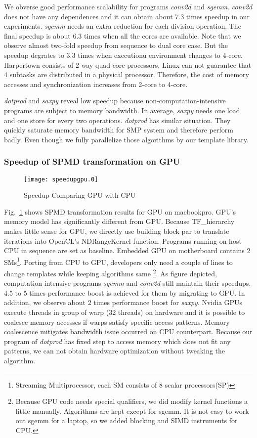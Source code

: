 We obverse good performance scalability for programs
\textit{conv2d} and \textit{sgemm}. \textit{conv2d} does not have any dependences
and it can obtain about 7.3 times speedup in our experiments. \textit{sgemm}
needs an extra reduction for each division operation. The final
speedup is about 6.3 times when all the cores are available. Note that we
observe almost two-fold speedup from sequence to dual core case. But the speedup degrates to 3.3 times when executionu
environment changes to 4-core. Harpertown consists of 2-way quad-core processors,  Linux
can not guarantee that 4 subtasks are distributed in a physical
processor. Therefore, the cost of memory accesses and synchronization
increases from 2-core to 4-core.

\textit{dotprod} and \textit{saxpy} reveal low speedup because non-computation-intensive
programs are subject to memory bandwidth.  In average, \textit{saxpy} needs one load and one 
store for every two operations. \textit{dotprod} has similar
situation. They quickly saturate memory bandwidth for SMP system and
therefore perform badly. Even though we fully parallelize those
algorithms by our template library. 

\subsubsection{Speedup of  SPMD transformation on GPU}
\begin{figure}
\texttt{[image: speedupgpu.0]}
\caption{Speedup Comparing GPU with CPU}\label{fig:spdgpu}
\end{figure}

Fig.~\ref{fig:spdgpu} shows SPMD transformation results for GPU on
macbookpro. GPU's memory model has significantly different from
GPU. Because TF\_hierarchy makes little sense for GPU, we directly use building
block par to translate iterations into OpenCL's NDRangeKernel
function. Programs running on host CPU  in sequence are set as
baseline. Embedded GPU on motherboard contains 2
SMs\footnote{Streaming Multiprocessor, each SM consists of 8 scalar processors(SP)}.
Porting from CPU to GPU, developers only need a couple of lines to change
templates while keeping algorithms same \footnote{
Because GPU code needs special qualifiers, we did modify kernel
functions a little manually.  Algorithms are kept except for sgemm. It is not easy
 to work out sgemm for a laptop, so we added blocking and SIMD
 instruments for CPU.}. As figure depicted,  computation-intensive programs
\textit{sgemm} and \textit{conv2d} still maintain their speedups. 4.5 to 5 times
performance boost is achieved for them by migrating to GPU.
In addition, we observe about 2 times performance boost for
\textit{saxpy}. Nvidia GPUs execute
threads in group of warp (32 threads) on hardware and it is
possible to coalesce memory accesses if warps satisfy
specific access patterns. Memory coalescence mitigates bandwidth issue
occurred on CPU counterpart. Because our program of \textit{dotprod} has fixed
step to access memory which does not fit any patterns, we can not
obtain hardware optimization without tweaking the algorithm.

